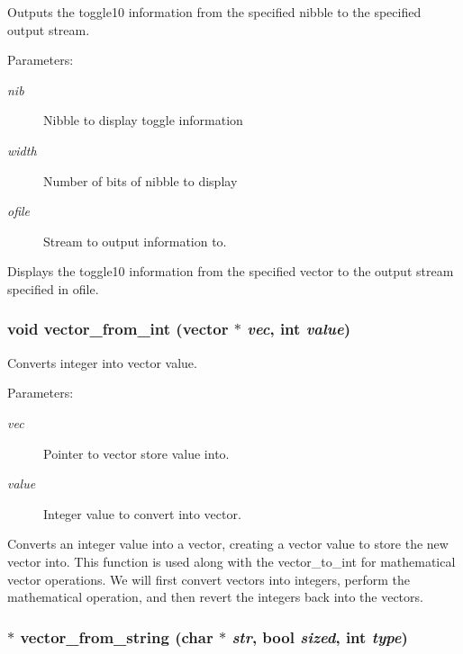 Outputs the toggle10 information from the specified nibble to the specified output stream.

\begin{Desc}
\item[Parameters: ]\par
\begin{description}
\item[{\em 
nib}]Nibble to display toggle information \item[{\em 
width}]Number of bits of nibble to display \item[{\em 
ofile}]Stream to output information to.\end{description}
\end{Desc}
Displays the toggle10 information from the specified vector to the output stream specified in ofile. 
\subsubsection{\setlength{\rightskip}{0pt plus 5cm}void vector\_\-from\_\-int ({\bf vector} $\ast$ {\em vec}, int {\em value})}\label{vector_8c_a26}


Converts integer into vector value.

\begin{Desc}
\item[Parameters: ]\par
\begin{description}
\item[{\em 
vec}]Pointer to vector store value into. \item[{\em 
value}]Integer value to convert into vector.\end{description}
\end{Desc}
Converts an integer value into a vector, creating a vector value to store the new vector into. This function is used along with the vector\_\-to\_\-int for mathematical vector operations. We will first convert vectors into integers, perform the mathematical operation, and then revert the integers back into the vectors. 
\subsubsection{$\ast$ vector\_\-from\_\-string (char $\ast$ {\em str}, {\bf bool} {\em sized}, int {\em type})}\label{vector_8c_a29}



